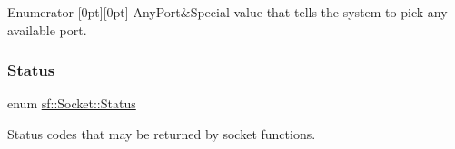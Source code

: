 \begin{DoxyEnumFields}{Enumerator}
[0pt][0pt]{}\mbox{\label{classsf_1_1_socket_a478fc5d82347df37c24f10c32de8cca7a5a3c30fd128895403afc11076f461b19}} 
Any\+Port&Special value that tells the system to pick any available port. \\
\hline

\end{DoxyEnumFields}
\mbox{\label{classsf_1_1_socket_a51bf0fd51057b98a10fbb866246176dc}} 
\subsubsection{\texorpdfstring{Status}{Status}}
{\footnotesize\ttfamily enum \hyperlink{classsf_1_1_socket_a51bf0fd51057b98a10fbb866246176dc}{sf\+::\+Socket\+::\+Status}}



Status codes that may be returned by socket functions. 

